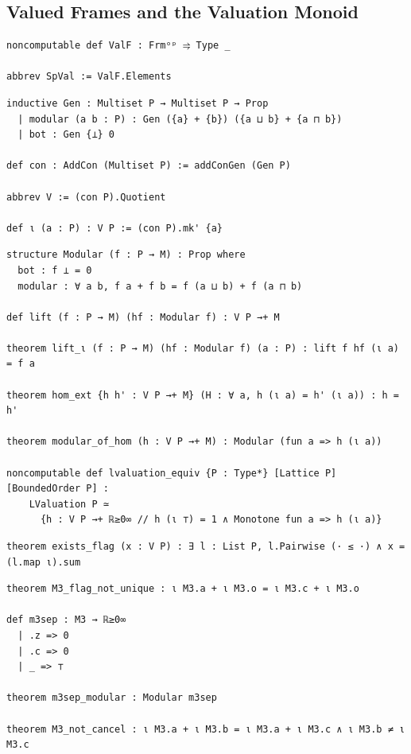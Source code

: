 \subsection{Valued Frames and the Valuation Monoid}

\label{lean:valf}
\begin{lstlisting}
noncomputable def ValF : Frmᵒᵖ ⥤ Type _

abbrev SpVal := ValF.Elements
\end{lstlisting}

\label{lean:vmonoid}
\begin{lstlisting}
inductive Gen : Multiset P → Multiset P → Prop
  | modular (a b : P) : Gen ({a} + {b}) ({a ⊔ b} + {a ⊓ b})
  | bot : Gen {⊥} 0

def con : AddCon (Multiset P) := addConGen (Gen P)

abbrev V := (con P).Quotient

def ι (a : P) : V P := (con P).mk' {a}
\end{lstlisting}

\label{lean:vmonoid-lift}
\begin{lstlisting}
structure Modular (f : P → M) : Prop where
  bot : f ⊥ = 0
  modular : ∀ a b, f a + f b = f (a ⊔ b) + f (a ⊓ b)

def lift (f : P → M) (hf : Modular f) : V P →+ M

theorem lift_ι (f : P → M) (hf : Modular f) (a : P) : lift f hf (ι a) = f a

theorem hom_ext {h h' : V P →+ M} (H : ∀ a, h (ι a) = h' (ι a)) : h = h'

theorem modular_of_hom (h : V P →+ M) : Modular (fun a => h (ι a))

noncomputable def lvaluation_equiv {P : Type*} [Lattice P] [BoundedOrder P] :
    LValuation P ≃
      {h : V P →+ ℝ≥0∞ // h (ι ⊤) = 1 ∧ Monotone fun a => h (ι a)}
\end{lstlisting}

\label{lean:vmonoid-flag}
\begin{lstlisting}
theorem exists_flag (x : V P) : ∃ l : List P, l.Pairwise (· ≤ ·) ∧ x = (l.map ι).sum
\end{lstlisting}

\label{lean:vmonoid-m3}
\begin{lstlisting}
theorem M3_flag_not_unique : ι M3.a + ι M3.o = ι M3.c + ι M3.o

def m3sep : M3 → ℝ≥0∞
  | .z => 0
  | .c => 0
  | _ => ⊤

theorem m3sep_modular : Modular m3sep

theorem M3_not_cancel : ι M3.a + ι M3.b = ι M3.a + ι M3.c ∧ ι M3.b ≠ ι M3.c
\end{lstlisting}

